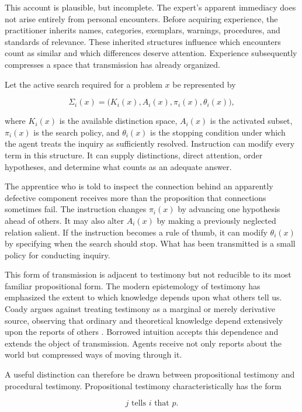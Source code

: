 \documentclass[11pt]{article}
\begin{document}
This account is plausible, but incomplete. The expert's apparent immediacy does not arise entirely from personal encounters. Before acquiring experience, the practitioner inherits names, categories, exemplars, warnings, procedures, and standards of relevance. These inherited structures influence which encounters count as similar and which differences deserve attention. Experience subsequently compresses a space that transmission has already organized.

Let the active search required for a problem $x$ be represented by

\[
\Sigma_i(x)
=
\bigl(
K_i(x),A_i(x),\pi_i(x),\theta_i(x)
\bigr),
\]

where $K_i(x)$ is the available distinction space, $A_i(x)$ is the activated subset, $\pi_i(x)$ is the search policy, and $\theta_i(x)$ is the stopping condition under which the agent treats the inquiry as sufficiently resolved. Instruction can modify every term in this structure. It can supply distinctions, direct attention, order hypotheses, and determine what counts as an adequate answer.

The apprentice who is told to inspect the connection behind an apparently defective component receives more than the proposition that connections sometimes fail. The instruction changes $\pi_i(x)$ by advancing one hypothesis ahead of others. It may also alter $A_i(x)$ by making a previously neglected relation salient. If the instruction becomes a rule of thumb, it can modify $\theta_i(x)$ by specifying when the search should stop. What has been transmitted is a small policy for conducting inquiry.

This form of transmission is adjacent to testimony but not reducible to its most familiar propositional form. The modern epistemology of testimony has emphasized the extent to which knowledge depends upon what others tell us. Coady argues against treating testimony as a marginal or merely derivative source, observing that ordinary and theoretical knowledge depend extensively upon the reports of others \cite{coady1992}. Borrowed intuition accepts this dependence and extends the object of transmission. Agents receive not only reports about the world but compressed ways of moving through it.

A useful distinction can therefore be drawn between propositional testimony and procedural testimony. Propositional testimony characteristically has the form

\[
j \text{ tells } i \text{ that } p.
\]
\end{document}
